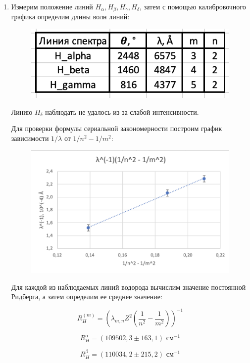 \documentclass[a4paper, 12pt]{article}%
\begin{document}
\begin{enumerate}
\item Измерим положение линий $H_{\alpha},  H_{\beta},  H_{\gamma},  H_{\delta}$,  затем с помощью калибровочного графика определим длины волн линий:

	\begin{figure}[h!]
		\centering
		\includegraphics[scale=0.8]{Таблица_2.PNG}
	\end{figure}

Линию $H_{\delta}$ наблюдать не удалось из-за слабой интенсивности. 

Для проверки формулы сериальной закономерности построим график зависимости $1 / \lambda$ от $1/ n^2 - 1/m^2$:

	\begin{figure}[h!]
		\centering
		\includegraphics[scale=0.7]{График_2.PNG}
	\end{figure}
	
Для каждой из наблюдаемых линий водорода вычислим значение постоянной Ридберга, а затем определим ее среднее значение:

\[R_H^{(m)} = \left(\lambda_{m, n} Z^2 \left(\dfrac{1}{n^2} - \dfrac{1}{m^2}\right)\right)^{-1}\]

\[R_H^{\alpha} = (109502,3 \pm 163,1) \text{ см}^{-1}\]

\[R_H^{\beta} = (110034,2 \pm 215,2) \text{ см}^{-1}\]


\end{enumerate}
\end{document}
